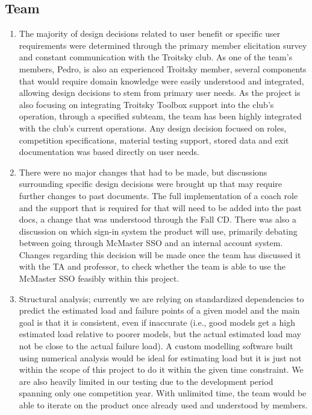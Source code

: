 \documentclass[12pt, titlepage]{article}
\begin{document}
\subsection{Team}
\begin{enumerate}

  \item The majority of design decisions related to user benefit or specific user requirements were determined through the primary member elicitation survey and constant communication with the Troitsky club. As one of the team's members, Pedro, is also an experienced Troitsky member, 
  several components that would require domain knowledge were easily understood and integrated, allowing design decisions to stem from primary user needs. As the project is also focusing on integrating Troitsky Toolbox support into the club's operation, through a specified subteam, the team has been highly integrated with the club's current operations. 
  Any design decision focused on roles, competition specifications, material testing support, stored data and exit documentation was based directly on user needs.
  
  \item There were no major changes that had to be made, but discussions surrounding specific design decisions were brought up that may require further changes to past documents. The full implementation of a coach role and the support that is required for that will need to be added into the past docs, a change that was understood through the Fall CD. 
  There was also a discussion on which sign-in system the product will use, primarily debating between going through McMaster SSO and an internal account system. Changes regarding this decision will be made once the team has discussed it with the TA and professor, to check whether the team is able to use the McMaster SSO feasibly within this project.
  
  \item Structural analysis; currently we are relying on standardized dependencies to predict the estimated load and failure points of a given model and the main goal is that it is consistent, even if inaccurate (i.e., good models get a high estimated load relative to poorer models, but the actual estimated load may not be close to the actual failure load). A custom modelling software built using numerical analysis would be ideal for estimating load but it is just not within the scope of this project to do it within the given time constraint. 
  We are also heavily limited in our testing due to the development period spanning only one competition year. With unlimited time, the team would be able to iterate on the product once already used and understood by members.
  

\end{enumerate}
\end{document}
